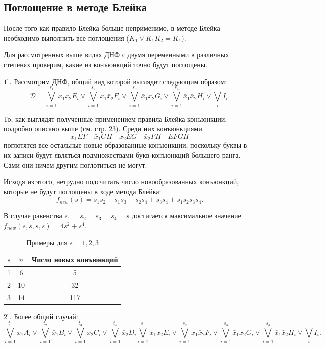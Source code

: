 \documentclass[12pt,a4paper,oneside,fleqn,leqno]{article}
\theoremstyle{definition}
\begin{document}
		\subsection{Поглощение в методе Блейка}
			После того как правило Блейка больше неприменимо, в методе Блейка необходимо выполнить все поглощения ($K_1 \vee K_1K_2 = K_1$).\par
			Для рассмотренных выше видах ДНФ с двумя переменными в различных степенях проверим, какие из конъюнкций точно будут поглощены.\par
			$1^{\circ}.$ Рассмотрим ДНФ, общий вид которой выглядит следующим образом:
			$$
				\mathcal{D} = \bigvee_{i = 1}^{s_1}x_1x_2E_i \vee \bigvee_{i = 1}^{s_2}x_1\bar{x}_2F_i \vee \bigvee_{i = 1}^{s_3}\bar{x}_1x_2G_i \vee \bigvee_{i = 1}^{s_4}\bar{x}_1\bar{x}_2H_i \vee \bigvee_iI_i.
			$$\par
			То, как выглядят полученные применением правила Блейка конъюнкции, подробно описано выше (см. стр. 23). Среди них конъюнкциями
			$$x_1EF\quad \bar{x}_1GH \quad x_2EG \quad \bar{x}_2FH \quad EFGH$$
			поглотятся все остальные новые образованные конъюнкции, поскольку буквы в их записи будут являться подмножествами букв конъюнкций большего ранга. Сами они ничем другим поглотиться не могут.\par
			Исходя из этого, нетрудно подсчитать число новообразованных конъюнкций, которые не будут поглощены в ходе метода Блейка:
			$$
				f_{new}(\bar{s}) = s_1s_2 + s_1s_3 + s_2s_4 + s_3s_4 + s_1s_2s_3s_4.
			$$\par
			В случае равенства $s_1 = s_2 = s_3 = s_4 = s$ достигается максимальное значение $f_{new}(s, s, s, s) = 4s^2 + s^4.$
\par
			\begin{table}[H]
				\centering
				\begin{tabular}{|c|c|c|}
					\hline
					$s$ & $n$ & Число новых конъюнкций\\
					\hline
					1 & 6 & 5\\
					\hline
					2 & 10 & 32\\
					\hline
					3 & 14 & 117\\
					\hline
				\end{tabular}
				\caption*{Примеры для $s = 1, 2, 3$}
			\end{table}\par
			$2^{\circ}.$ Более общий случай:
			$$
				\bigvee_{i = 1}^{t_1}x_1A_i \vee \bigvee_{i = 1}^{t_2}\bar{x}_1B_i \vee \bigvee_{i = 1}^{t_3}x_2C_i \vee \bigvee_{i = 1}^{t_4}\bar{x}_2D_i \bigvee_{i = 1}^{s_1}x_1x_2E_i \vee \bigvee_{i = 1}^{s_2}x_1\bar{x}_2F_i \vee \bigvee_{i = 1}^{s_3}\bar{x}_1x_2G_i \vee \bigvee_{i = 1}^{s_4}\bar{x}_1\bar{x}_2H_i \vee \bigvee_iI_i.
			$$\par
\end{document}
